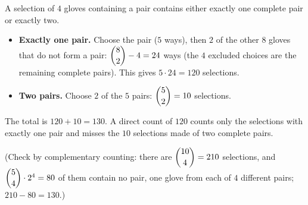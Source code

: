 A selection of $4$ gloves containing a pair contains either exactly one complete pair or exactly two.
\begin{itemize}
\item \textbf{Exactly one pair.} Choose the pair ($5$ ways), then $2$ of the other $8$ gloves that do not form a pair: $\dbinom82-4=24$ ways (the $4$ excluded choices are the remaining complete pairs). This gives $5\cdot24=120$ selections.
\item \textbf{Two pairs.} Choose $2$ of the $5$ pairs: $\dbinom52=10$ selections.
\end{itemize}
The total is $120+10=\boxed{130}$. A direct count of $120$ counts only the selections with exactly one pair and misses the $10$ selections made of two complete pairs.

(Check by complementary counting: there are $\dbinom{10}4=210$ selections, and $\dbinom54\cdot2^4=80$ of them contain no pair, one glove from each of $4$ different pairs; $210-80=130$.)
